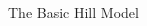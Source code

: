 \documentclass[final]{beamer}
\begin{document}
\begin{frame}
\begin{columns}
\begin{column}{.3\textwidth}
\begin{block}{The Basic Hill Model}
\begin{block}{}
        \end{block}
      \end{block}
    \end{column}
    

\end{columns}
\end{frame}
\end{document}
